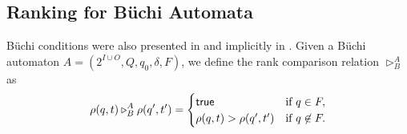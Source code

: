 

\subsection{Ranking for B\"uchi Automata}

B\"uchi conditions were also presented in \cite{VacSy}
and implicitly in \cite{bounded-pctl}.
Given a B\"uchi automaton $A = (2^{I\cup O}, Q, q_0, \delta, F)$, we
define the rank comparison relation $\triangleright^A_B$ as
\begin{equation}\label{eq:rank:buchi}
\rho(q,t) \triangleright^A_B \rho(q',t') =
\begin{cases}
  \textsf{true}                    & \text{if } q \in F,\\
  \rho(q,t)>\rho(q',t')  & \text{if } q \not\in F.
\end{cases}
\end{equation}

